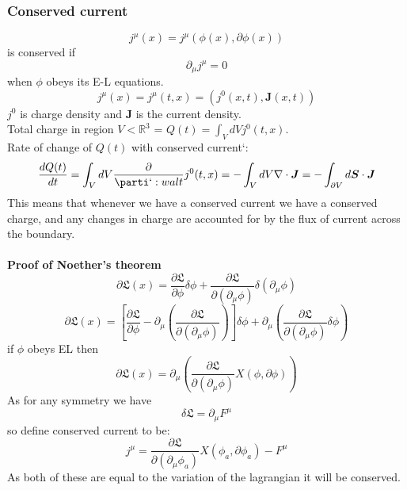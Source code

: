 \documentclass[12pt, a4paper, twoside, titlepage]{article}
\begin{document}
\subsubsection{Conserved current}
$$
j^{\mu} (x) = j^{\mu}(\phi(x), \partial\phi(x))
$$
is conserved if 
$$
\partial_{\mu} j^{\mu} = 0
$$
when $\phi$ obeys its E-L equations.
$$
j^{\mu}(x) = j^{\mu}(t,x) = (j^0(x,t), \bm J(x,t))
$$
$j^0$ is charge density and $\bm J$ is the current density.\\
Total charge in region $V < \mathbb{R}^3$ = $ Q(t) = \int_V dV j^0(t,x)$.\\
Rate of change of $Q(t)$ with conserved current`: $$\frac{dQ(t)}{dt} = \int_V dV \frac{\partial}{\parti`:w
al t} j^0(t,x)  = - \int_V dV \nabla \cdot \bm J = - \int_{\partial V} d \bm S \cdot \bm J $$
This means that whenever we have a conserved current we have a conserved charge, and any changes in charge are accounted for by the flux of current across the boundary.\\\\
\textbf{Proof of Noether's theorem}
$$
\partial \mathfrak{L} (x) = \frac{\partial \mathfrak{L}}{\partial \phi} \delta \phi + \frac{\partial \mathfrak{L}}{\partial(\partial_{\mu}\phi)} \delta (\partial_{\mu} \phi)
$$
$$
\partial \mathfrak{L} (x) = [\frac{\partial \mathfrak{L}}{\partial \phi} - \partial_{\mu} (\frac{\partial \mathfrak{L}}{\partial (\partial_{\mu} \phi)}) ] \delta \phi + \partial_{\mu} (\frac{\partial \mathfrak{L}}{\partial(\partial_{\mu} \phi)} \delta \phi)
$$
if $\phi$ obeys EL then
\begin{equation}
\partial \mathfrak{L} (x) = \partial_{\mu} (\frac{\partial \mathfrak{L} }{\partial(\partial_{\mu}\phi)} X(\phi, \partial \phi))
\end{equation}
As for any symmetry we have 
$$
\delta \mathfrak{L} = \partial_{\mu} F^{\mu}
$$
so define conserved current to be:
$$
j^{\mu} = \frac{\partial \mathfrak{L} }{\partial(\partial_{\mu}\phi_a)} X(\phi_a, \partial \phi_a) - F^{\mu}
$$
As both of these are equal to the variation of the lagrangian it will be conserved.
\end{document}
